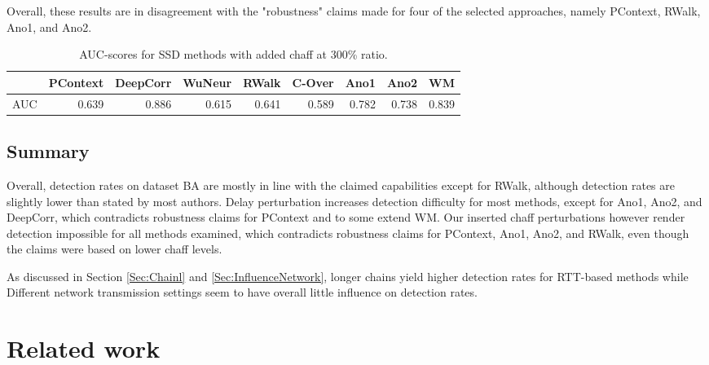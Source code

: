 \documentclass[runningheads,11pt]{llncs}\usepackage[]{graphicx}\usepackage[]{color}
\begin{document}
Overall, these results are in disagreement with the "robustness" claims made for four of the selected approaches, namely PContext, RWalk, Ano1, and Ano2.

\begin{table}
\centering
\begin{tabular}{l|r|r|r|r|r|r|r|r}
  \hline
 & PContext & DeepCorr & WuNeur & RWalk & C-Over & Ano1 & Ano2 & WM \\ 
  \hline
AUC & 0.639 & 0.886 & 0.615 & 0.641 & 0.589 & 0.782 & 0.738 & 0.839 \\ 
   \hline
\end{tabular}

\caption{AUC-scores for SSD methods with added chaff at 300\% ratio.}\label{Tab:AUCchaff}
\end{table}





\subsection{Summary}

Overall, detection rates on dataset BA are mostly in line with the claimed capabilities except for RWalk, although detection rates are slightly lower than stated by most authors. Delay perturbation increases detection difficulty for most methods, except for Ano1, Ano2, and DeepCorr, which contradicts robustness claims for PContext and to some extend WM. Our inserted chaff perturbations however render detection impossible for all methods examined, which contradicts robustness claims for PContext, Ano1, Ano2, and RWalk, even though the claims were based on lower chaff levels. 

As discussed in Section \ref{Sec:Chainl} and \ref{Sec:InfluenceNetwork}, longer chains yield higher detection rates for RTT-based methods while Different network transmission settings seem to have overall little influence on detection rates. 


\section{Related work}\label{Sec:Relatedwork}
\end{document}
